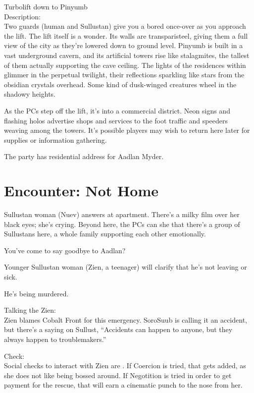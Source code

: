 \documentclass{book}
\newcommand{\df}{\difficulty}
\begin{document}
\begin{multicols}{2}
Turbolift down to Pinyumb\\
Description:\\
Two guards (human and Sullustan) give you a bored once-over as you approach the lift. The lift itself is a wonder. Its walls are transparisteel, giving them a full view of the city as they’re lowered down to ground level. Pinyumb is built in a vast underground cavern, and its artificial towers rise like stalagmites, the tallest of them actually supporting the cave ceiling. The lights of the residences within glimmer in the perpetual twilight, their reflections sparkling like stars from the obsidian crystals overhead. Some kind of dusk-winged creatures wheel in the shadowy heights.

As the PCs step off the lift, it’s into a commercial district. Neon signs and flashing holos advertise shops and services to the foot traffic and speeders weaving among the towers. It's possible players may wish to return here later for supplies or information gathering.

The party has residential address for Aadlan Myder.

\section{Encounter: Not Home}

Sullustan woman (Nuev) answers at apartment. There’s a milky film over her black eyes; she’s crying. Beyond here, the PCs can she that there’s a group of Sullustans here, a whole family supporting each other emotionally.
\begin{quoting}
You’ve come to say goodbye to Aadlan? 
\end{quoting}

Younger Sullustan woman (Zien, a teenager) will clarify that he’s not leaving or sick.
\begin{quoting}
He’s being murdered.
\end{quoting}

Talking the Zien:\\
Zien blames Cobalt Front for this emergency. SoroSuub is calling it an accident, but there’s a saying on Sullust, “Accidents can happen to anyone, but they always happen to troublemakers.”

Check:\\
Social checks to interact with Zien are \df\df. If Coercion is tried, that gets \setback added, as she does not like being bossed around. If Negotition is tried in order to get payment for the rescue, that will earn a cinematic punch to the nose from her. 


\end{multicols}
\end{document}
